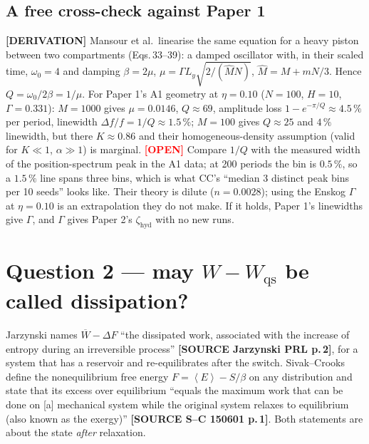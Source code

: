 \documentclass[11pt,a4paper]{article}
\newcommand{\avg}[1]{\left\langle #1 \right\rangle}
\newcommand{\src}[1]{\textcolor{OliveGreen}{\textbf{[SOURCE #1]}}}
\newcommand{\der}{\textcolor{NavyBlue}{\textbf{[DERIVATION]}}}
\newcommand{\opn}{\textcolor{Red}{\textbf{[OPEN]}}}
\begin{document}
\subsection{A free cross-check against Paper 1}
\der{} Mansour et al.\ linearise the same equation for a heavy piston between two compartments (Eqs.\,33--39): a damped oscillator with, in their scaled time, $\omega_0 = 4$ and damping $\beta = 2\mu$, $\mu = \Gamma L_y\sqrt{2/(\hat M N)}$, $\hat M = M + mN/3$. Hence $Q = \omega_0/2\beta = 1/\mu$. For Paper 1's A1 geometry at $\eta = 0.10$ ($N = 100$, $H = 10$, $\Gamma = 0.331$): $M = 1000$ gives $\mu = 0.0146$, $Q \approx 69$, amplitude loss $1 - e^{-\pi/Q} \approx 4.5\,\%$ per period, linewidth $\Delta f/f = 1/Q \approx 1.5\,\%$; $M = 100$ gives $Q \approx 25$ and $4\,\%$ linewidth, but there $K \approx 0.86$ and their homogeneous-density assumption (valid for $K \ll 1$, $\alpha \gg 1$) is marginal. \opn{} Compare $1/Q$ with the measured width of the position-spectrum peak in the A1 data; at 200 periods the bin is $0.5\,\%$, so a $1.5\,\%$ line spans three bins, which is what CC's ``median 3 distinct peak bins per 10 seeds'' looks like. Their theory is dilute ($n = 0.0028$); using the Enskog $\Gamma$ at $\eta = 0.10$ is an extrapolation they do not make. If it holds, Paper 1's linewidths give $\Gamma$, and $\Gamma$ gives Paper 2's $\zeta_{\mathrm{hyd}}$ with no new runs.

\section{Question 2 --- may $W - W_{\mathrm{qs}}$ be called dissipation?}

Jarzynski names $\overline W - \Delta F$ ``the dissipated work, associated with the increase of entropy during an irreversible process'' \src{Jarzynski PRL p.\,2}, for a system that has a reservoir and re-equilibrates after the switch. Sivak--Crooks define the nonequilibrium free energy $F = \avg E - S/\beta$ on any distribution and state that its excess over equilibrium ``equals the maximum work that can be done on [a] mechanical system while the original system relaxes to equilibrium (also known as the exergy)'' \src{S--C 150601 p.\,1}. Both statements are about the state \emph{after} relaxation.
\end{document}
